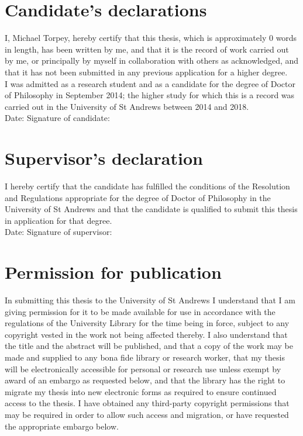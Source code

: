 
\section*{Candidate's declarations}

\noindent
I, Michael Torpey, hereby certify that this thesis, which is approximately
0
words in length, has been written by me, and that it is the record of work
carried out by me, or principally by myself in collaboration with others as
acknowledged, and that it has not been submitted in any previous application for
a higher degree. \\

\noindent
I was admitted as a research student and as a candidate for the degree of Doctor
of Philosophy in September 2014; the higher study for which this is a record was
carried out in the University of St Andrews between 2014 and 2018. \\

\noindent
Date:\makebox[7em]{\dotfill}
Signature of candidate:\dotfill
\\
\vspace{-0.5em}

\section*{Supervisor's declaration}

\noindent
I hereby certify that the candidate has fulfilled the conditions of the
Resolution and Regulations appropriate for the degree of Doctor of Philosophy in
the University of St Andrews and that the candidate is qualified to submit this
thesis in application for that degree. \\

\noindent
Date:\makebox[7em]{\dotfill}
Signature of supervisor:\dotfill
\\
\vspace{-0.5em}

\section*{Permission for publication}

\noindent
In submitting this thesis to the University of St Andrews I understand that I am
giving permission for it to be made available for use in accordance with the
regulations of the University Library for the time being in force, subject to
any copyright vested in the work not being affected thereby.  I also understand
that the title and the abstract will be published, and that a copy of the work
may be made and supplied to any bona fide library or research worker, that my
thesis will be electronically accessible for personal or research use unless
exempt by award of an embargo as requested below, and that the library has the
right to migrate my thesis into new electronic forms as required to ensure
continued access to the thesis. I have obtained any third-party copyright
permissions that may be required in order to allow such access and migration, or
have requested the appropriate embargo below. \\

